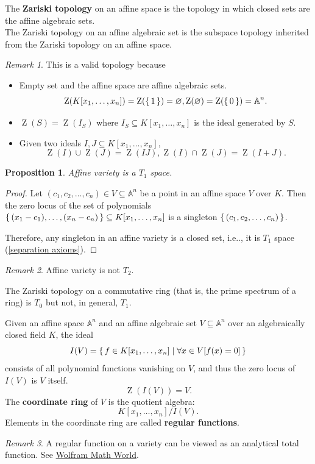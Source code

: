 \documentclass[12pt, letterpaper]{article}
\makeatletter
\newcommand{\ZZ}{\operatorname{Z}}
\newcommand\ie{i.e\@ifnextchar.{}{.\@}}
\renewcommand{\emptyset}{\varnothing}
\newtheorem{prop}{Proposition}[section]
\theoremstyle{definition}
\theoremstyle{remark}
\newtheorem*{rem*}{Remark}
\theoremstyle{definition}
\theoremstyle{plain}
\numberwithin{equation}{section}
\makeatother
\begin{document}
	\begin{def*}
		The \textbf{Zariski topology} on an affine space is the topology in which
		closed sets are the affine algebraic sets.\\
		The Zariski topology on an affine algebraic set is the subspace topology
		inherited from the Zariski topology on an affine space.
	\end{def*}
	\begin{rem*}
		This is a valid topology because
		\begin{itemize}
			\item Empty set and the affine space are affine algebraic sets.
			\[\ZZ(K[x_1,\dots,x_n])=\ZZ(\set{1})=\emptyset, \ZZ(\emptyset)=\ZZ(\set{0})=\mathbb{A}^n.\]
			\item $\ZZ(S)=\ZZ(I_S)$ where $I_S\subseteq K[x_1,\dots,x_n]$ is the ideal generated by $S$.
			\item Given two ideals $I,J\subseteq K[x_1,\dots,x_n]$,
			\[\ZZ(I)\cup\ZZ(J)=\ZZ(IJ), \ZZ(I)\cap\ZZ(J)=\ZZ(I+J). \]
		\end{itemize}
	\end{rem*}

	\begin{prop}
		Affine variety is a $T_1$ space.
	\end{prop}
	\begin{proof}
		Let $(c_1,c_2,\dots,c_n)\in V\subseteq\mathbb{A}^n$ be a point in an affine space $V$ over $K$.
		Then the zero locus of the set of polynomials $\set{(x_1-c_1),\dots,(x_n-c_n)}\subseteq K[x_1,\dots,x_n]$
		is a singleton $\set{(c_1,c_2,\dots,c_n)}$.
		
		Therefore, any singleton in an affine variety is a closed set, \ie, it is $T_1$ space (\ref{separation axioms}).
	\end{proof}
	\begin{rem*}
		Affine variety is not $T_2$.
		
		The Zariski topology on a commutative ring (that is, the prime spectrum of a ring) is $T_0$ but not, in general, $T_1$.
	\end{rem*}

	\begin{def*}
		Given an affine space $\mathbb{A}^n$ and
		an affine algebraic set $V\subseteq\mathbb{A}^n$ over an algebraically closed field $K$,
		the ideal
		\[I(V)=\set{f\in K[x_1,\dots,x_n]|\forall x\in V[f(x)=0] } \]
		consists of all polynomial functions vanishing on $V$,
		and thus the zero locus of $I(V)$ is $V$ itself.
		\[ \ZZ(I(V))=V. \]
		The \textbf{coordinate ring} of $V$ is the quotient algebra:
		\[  K[x_1,\dots,x_n]/I(V). \]
		Elements in the coordinate ring are called \textbf{regular functions}.
	\end{def*}
	\begin{rem*}
		A regular function on a variety can be viewed as an analytical total function.
		See \href{https://mathworld.wolfram.com/RegularFunction.html}{Wolfram Math World}.
	\end{rem*}
\end{document}
